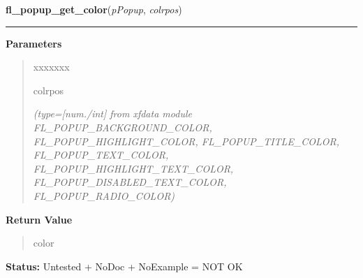 \hspace{.8\funcindent}\begin{boxedminipage}{\funcwidth}

    \raggedright \textbf{fl\_popup\_get\_color}(\textit{pPopup}, \textit{colrpos})

    \vspace{-1.5ex}

    \rule{\textwidth}{0.5\fboxrule}
\setlength{\parskip}{2ex}
\setlength{\parskip}{1ex}
      \textbf{Parameters}
      \vspace{-1ex}

      \begin{quote}
        \begin{Ventry}{xxxxxxx}

          \item[colrpos]

            {\it (type=[num./int] from xfdata module FL\_POPUP\_BACKGROUND\_COLOR, 
FL\_POPUP\_HIGHLIGHT\_COLOR, FL\_POPUP\_TITLE\_COLOR, 
FL\_POPUP\_TEXT\_COLOR, FL\_POPUP\_HIGHLIGHT\_TEXT\_COLOR, 
FL\_POPUP\_DISABLED\_TEXT\_COLOR, FL\_POPUP\_RADIO\_COLOR)}

        \end{Ventry}

      \end{quote}

      \textbf{Return Value}
    \vspace{-1ex}

      \begin{quote}
      color

      \end{quote}

\textbf{Status:} Untested + NoDoc + NoExample = NOT OK



    \end{boxedminipage}

    \label{xformslib:library:fl_popup_set_color}

    \vspace{0.5ex}

